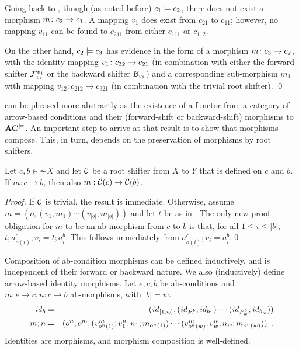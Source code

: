 \begin{example}
Going back to , though (as noted before) $c_1\models c_2$, there does not exist a morphism $m\colon c_2\rightarrow c_1$. A mapping $v_1$ does exist from $c_{21}$ to $c_{11}$; however, no mapping $v_{11}$ can be found to $c_{211}$ from either $c_{111}$ or $c_{112}$. 

On the other hand, $c_2\models c_3$ has evidence in the form of a morphism $m\colon c_3\rightarrow c_2$, with the identity mapping $v_1\colon c_{32} \rightarrow c_{21}$ (in combination with either the forward shifter $\mathcal{F}_{v_1}^{v_1}$ or the backward shifter $\mathcal{B}_{v_1}$) and a corresponding sub-morphism $m_1$ with mapping $v_{12}:c_{212}\to c_{321}$ (in combination with the trivial root shifter).
\qed
\end{example}
%
 can be phrased more abstractly as the existence of a functor from a category of arrow-based conditions and their (forward-shift or backward-shift) morphisms to $\mathbf{AC}^{\models}$. An important step to arrive at that result is to show that morphisms compose. This, in turn, depends on the preservation of morphisms by root shifters.

\begin{lemma}
Let $c,b \in  \AC{X}$ and let $\mathcal{C}$ be a root shifter from $X$ to $Y$ that is defined on $c$ and $b$. If $m:c\to b$, then also $m:\mathcal{C}(c)\rightarrow\mathcal{C}(b)$. 
\end{lemma}
%
\begin{fullorname}
\begin{proof}
If $\mathcal{C}$ is trivial, the result is immediate. Otherwise, assume $m = (o,(v_1,m_1)\cdots(v_{|b|},m_{|b|}))$ and let $t$ be as in . The only new proof obligation for $m$ to be an ab-morphism from $c$ to $b$ is that, for all $1\leq i\leq |b|$, $t;a^c_{o(i)};v_i=t;a^b_i$. This follows immediately from $a^c_{o(i)};v_i=a^b_i$.\qed
\end{proof}
\end{fullorname}
%
Composition of ab-condition morphisms can be defined inductively, and is independent of their forward or backward nature. We also (inductively) define arrow-based identity morphisms. Let $e,c,b$ be ab-conditions and $m:e\to c,n:c\to b$ ab-morphisms, with $|b|=w$.
%
\begin{eqnarray}
\id_b & =
  & (\id_{[1,w]},(\id_{P^b_1},\id_{b_1})\cdots 
                 (\id_{P^b_w},\id_{b_w}))
  \eqlabel{id-morphism} \\
m;n & =
  & (o^n;o^m,(v^m_{o^n(1)};v^n_1,n_1;m_{o^n(1)})\cdots 
              (v^m_{o^n(w)};v^n_w,n_w;m_{o^n(w)})) \enspace.
 \eqlabel{morphism composition}
\end{eqnarray}
%
Identities are morphisms, and morphism composition is well-defined.


